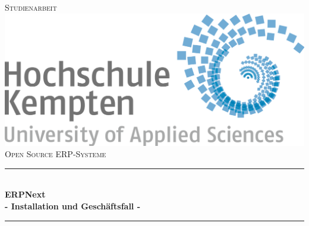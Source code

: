 \documentclass[
  fontsize=12pt, %
  a4paper,  %
  oneside,  %
  bibliography=totoc,
  headsepline,
  cleardoublepage=empty,
  parskip=half,
  draft=false
]{scrbook}
\begin{document}
\begin{titlepage}

\newcommand{\HRule}{\rule{\linewidth}{0.5mm}} %

\center %
 

\textsc{\LARGE Studienarbeit}\\[1.5cm] %
\includegraphics[scale=.15]{logos/Logo_Hochschule_Kempten.png}\\[1cm] %
\textsc{\Large Open Source ERP-Systeme}\\[0.5cm] %


\HRule \\[0.4cm]
{ \huge \bfseries ERPNext \\ \Large - Installation und Geschäftsfall -}\\[0.4cm] %
\HRule \\[1.5cm]
 

\end{titlepage}
\end{document}
